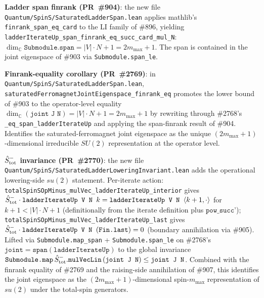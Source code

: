 \documentclass[a4paper,11pt]{article}
\begin{document}
\textbf{Ladder span finrank (PR~\#904)}: the new file
\texttt{Quantum/SpinS/SaturatedLadderSpan.lean} applies mathlib's
\texttt{finrank\_span\_eq\_card} to the LI family of \#896,
yielding
\texttt{ladderIterateUp\_span\_finrank\_eq\_succ\_card\_mul\_N}:
$\dim_\mathbb{C} \texttt{Submodule.span} = |V|\cdot N + 1 =
2m_{\max} + 1$. The span is contained in the joint eigenspace
of \#903 via \texttt{Submodule.span\_le}.

\textbf{Finrank-equality corollary (PR~\#2769)}: in
\texttt{Quantum/SpinS/SaturatedLadderSpan.lean},
\texttt{saturatedFerromagnetJointEigenspace\_finrank\_eq} promotes
the lower bound of \#903 to the operator-level equality
$\dim_\mathbb{C}(\texttt{joint J N}) = |V|\cdot N + 1 = 2m_{\max}+1$
by rewriting through \#2768's \texttt{\_eq\_span\_ladderIterateUp}
and applying the span-finrank result of \#904. Identifies the
saturated-ferromagnet joint eigenspace as the unique
$(2m_{\max}+1)$-dimensional irreducible $SU(2)$ representation at
the operator level.

\textbf{$\hat S^-_{\rm tot}$ invariance (PR~\#2770)}: the new file
\texttt{Quantum/SpinS/SaturatedLadderLoweringInvariant.lean} adds
the operational lowering-side $su(2)$ statement.
Per-iterate action:
\texttt{totalSpinSOpMinus\_mulVec\_ladderIterateUp\_interior} gives
$\hat S^-_{\rm tot}\cdot\texttt{ladderIterateUp V N }k =
\texttt{ladderIterateUp V N }\langle k+1, \cdot\rangle$ for $k+1 <
|V|\cdot N + 1$ (definitionally from the iterate definition plus
$\texttt{pow\_succ'}$);
\texttt{totalSpinSOpMinus\_mulVec\_ladderIterateUp\_last} gives
$\hat S^-_{\rm tot}\cdot\texttt{ladderIterateUp V N }(\texttt{Fin.last})
= 0$ (boundary annihilation via \#905). Lifted via
\texttt{Submodule.map\_span} + \texttt{Submodule.span\_le} on
\#2768's $\texttt{joint} = \texttt{span}(\texttt{ladderIterateUp})$
to the global invariance
$\texttt{Submodule.map}\,\hat S^-_{\rm tot}.\texttt{mulVecLin}\,
(\texttt{joint J N}) \le \texttt{joint J N}$. Combined with the
finrank equality of \#2769 and the raising-side annihilation of
\#907, this identifies the joint eigenspace as the
$(2m_{\max}+1)$-dimensional spin-$m_{\max}$ representation of
$su(2)$ under the total-spin generators.
\end{document}
